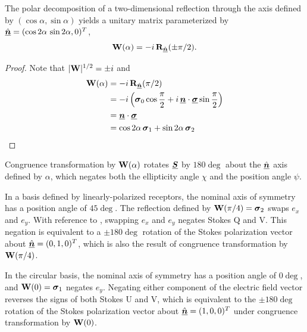 The polar decomposition of a two-dimensional reflection through the
axis defined by $(\cos\alpha, \sin\alpha)$ yields a unitary matrix parameterized by 
$\hat{\underline{\mbox{\boldmath $n$}}} = (\cos2\alpha\,\sin2\alpha,0)^T$,
%
\begin{equation}
{\bf W}(\alpha) = -i\, {\bf R}_{\hat{\underline{\mbox{\scriptsize\boldmath $n$}}}}(\pm\pi/2).
\end{equation}

\begin{proof}
Note that $|{\bf W}|^{1/2}=\pm i$ and
\begin{align*}
{\bf W}(\alpha)
    &= -i \, {\bf R}_{\hat{\underline{\mbox{\scriptsize\boldmath $n$}}}}(\pi/2) \\
    &= -i \left( \mbox{\boldmath $\sigma$}_{0}\cos\frac{\pi}{2} 
        + i \, \underline{\mbox{\boldmath $n$}} \cdot \underline{\mbox{\boldmath $\sigma$}} \sin\frac{\pi}{2} \right) \\
    &= \underline{\mbox{\boldmath $n$}} \cdot \underline{\mbox{\boldmath $\sigma$}} \\
    &= \cos2\alpha\, \mbox{\boldmath $\sigma$}_{1} + \sin2\alpha\, \mbox{\boldmath $\sigma$}_{2}
\end{align*}
\end{proof}
%
\noindent
Congruence transformation by ${\bf W}(\alpha)$ rotates $\underline{\mbox{\boldmath $S$}}$ by $180\deg$ about the $\hat{\underline{\mbox{\boldmath $n$}}}$ axis defined by $\alpha$, which negates both the ellipticity angle $\chi$ and the position angle $\psi$.

In a basis defined by linearly-polarized receptors, the nominal axis of symmetry
has a position angle of $45\deg$.
The reflection defined by ${\bf W}(\pi/4)=\mbox{\boldmath $\sigma$}_{2}$ swaps $e_x$ and $e_y$.
%
With reference to , swapping $e_x$ and $e_y$
negates Stokes Q and V.
%
This negation is equivalent to a $\pm 180\deg$ rotation of the Stokes polarization vector about $\hat{\underline{\mbox{\boldmath $n$}}} = (0,1,0)^T$,
which is also the result of congruence transformation by ${\bf W}(\pi/4)$.

In the circular basis, the nominal axis of symmetry
has a position angle of $0\deg$, and ${\bf W}(0)=\mbox{\boldmath $\sigma$}_{1}$ negates $e_y$.
%
Negating either component 
of the electric field vector reverses the signs of both Stokes U and V, 
which is equivalent to the $\pm 180\deg$ rotation of the Stokes polarization vector about 
$\hat{\underline{\mbox{\boldmath $n$}}} = (1,0,0)^T$ under congruence transformation by ${\bf W}(0)$.
